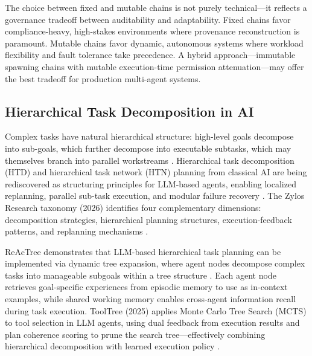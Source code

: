 The choice between fixed and mutable chains is not purely technical—it reflects a governance tradeoff between auditability and adaptability. Fixed chains favor compliance-heavy, high-stakes environments where provenance reconstruction is paramount. Mutable chains favor dynamic, autonomous systems where workload flexibility and fault tolerance take precedence. A hybrid approach—immutable spawning chains with mutable execution-time permission attenuation—may offer the best tradeoff for production multi-agent systems.

\subsection{Hierarchical Task Decomposition in AI}

Complex tasks have natural hierarchical structure: high-level goals decompose into sub-goals, which further decompose into executable subtasks, which may themselves branch into parallel workstreams \cite{huggingface_hierarchical_2024}. Hierarchical task decomposition (HTD) and hierarchical task network (HTN) planning from classical AI are being rediscovered as structuring principles for LLM-based agents, enabling localized replanning, parallel sub-task execution, and modular failure recovery \cite{zylos_htd_2026, geeksforgeeks_htn_2024}. The Zylos Research taxonomy (2026) identifies four complementary dimensions: decomposition strategies, hierarchical planning structures, execution-feedback patterns, and replanning mechanisms \cite{zylos_htd_2026}.

ReAcTree demonstrates that LLM-based hierarchical task planning can be implemented via dynamic tree expansion, where agent nodes decompose complex tasks into manageable subgoals within a tree structure \cite{openreview_reactree_2025}. Each agent node retrieves goal-specific experiences from episodic memory to use as in-context examples, while shared working memory enables cross-agent information recall during task execution. ToolTree (2025) applies Monte Carlo Tree Search (MCTS) to tool selection in LLM agents, using dual feedback from execution results and plan coherence scoring to prune the search tree—effectively combining hierarchical decomposition with learned execution policy \cite{zylos_htd_2026}.

